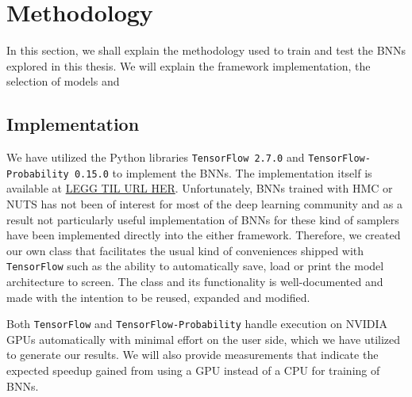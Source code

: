 \section{Methodology}
In this section, we shall explain the methodology used to train and test the BNNs explored in this thesis. We will explain the framework implementation, the selection of models and 

\subsection{Implementation}
We have utilized the Python libraries {\tt TensorFlow 2.7.0} and {\tt TensorFlow-Probability 0.15.0} to implement the BNNs. 
The implementation itself is available at \url{LEGG TIL URL HER}. Unfortunately, BNNs trained with HMC or NUTS has not been of interest for most of the deep learning community and as a result not particularly useful implementation of BNNs for these kind of samplers have been implemented directly into the either framework. Therefore, we created our own class that facilitates the usual kind of conveniences shipped with {\tt TensorFlow} such as the ability to automatically save, load or print the model architecture to screen. The class and its functionality is well-documented and made with the intention to be reused, expanded and modified. 

Both {\tt TensorFlow} and {\tt TensorFlow-Probability} handle execution on NVIDIA GPUs automatically with minimal effort on the user side, which we have utilized to generate our results. We will also provide measurements that indicate the expected speedup gained from using a GPU instead of a CPU for training of BNNs.
 


